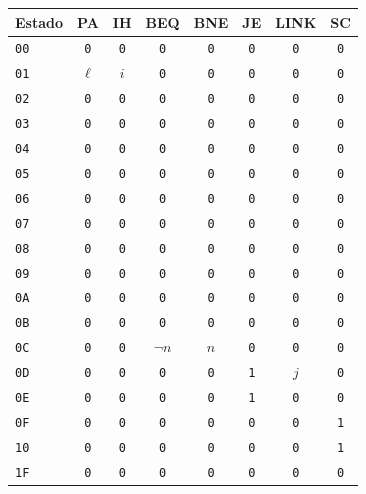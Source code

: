 \documentclass[11pt,a4paper]{article}
\begin{document}
\begin{center}
\footnotesize
\setlength{\tabcolsep}{5.4pt}
\begin{tabular}{@{}lccccccc@{}}
\toprule
Estado & PA & IH & BEQ & BNE & JE & LINK & SC \\
\midrule
\texttt{00} & \texttt{0} & \texttt{0} & \texttt{0} & \texttt{0} & \texttt{0} & \texttt{0} & \texttt{0} \\
\texttt{01} & $\ell$ & $i$ & \texttt{0} & \texttt{0} & \texttt{0} & \texttt{0} & \texttt{0} \\
\texttt{02} & \texttt{0} & \texttt{0} & \texttt{0} & \texttt{0} & \texttt{0} & \texttt{0} & \texttt{0} \\
\texttt{03} & \texttt{0} & \texttt{0} & \texttt{0} & \texttt{0} & \texttt{0} & \texttt{0} & \texttt{0} \\
\texttt{04} & \texttt{0} & \texttt{0} & \texttt{0} & \texttt{0} & \texttt{0} & \texttt{0} & \texttt{0} \\
\texttt{05} & \texttt{0} & \texttt{0} & \texttt{0} & \texttt{0} & \texttt{0} & \texttt{0} & \texttt{0} \\
\texttt{06} & \texttt{0} & \texttt{0} & \texttt{0} & \texttt{0} & \texttt{0} & \texttt{0} & \texttt{0} \\
\texttt{07} & \texttt{0} & \texttt{0} & \texttt{0} & \texttt{0} & \texttt{0} & \texttt{0} & \texttt{0} \\
\texttt{08} & \texttt{0} & \texttt{0} & \texttt{0} & \texttt{0} & \texttt{0} & \texttt{0} & \texttt{0} \\
\texttt{09} & \texttt{0} & \texttt{0} & \texttt{0} & \texttt{0} & \texttt{0} & \texttt{0} & \texttt{0} \\
\texttt{0A} & \texttt{0} & \texttt{0} & \texttt{0} & \texttt{0} & \texttt{0} & \texttt{0} & \texttt{0} \\
\texttt{0B} & \texttt{0} & \texttt{0} & \texttt{0} & \texttt{0} & \texttt{0} & \texttt{0} & \texttt{0} \\
\texttt{0C} & \texttt{0} & \texttt{0} & $\neg n$ & $n$ & \texttt{0} & \texttt{0} & \texttt{0} \\
\texttt{0D} & \texttt{0} & \texttt{0} & \texttt{0} & \texttt{0} & \texttt{1} & $j$ & \texttt{0} \\
\texttt{0E} & \texttt{0} & \texttt{0} & \texttt{0} & \texttt{0} & \texttt{1} & \texttt{0} & \texttt{0} \\
\texttt{0F} & \texttt{0} & \texttt{0} & \texttt{0} & \texttt{0} & \texttt{0} & \texttt{0} & \texttt{1} \\
\texttt{10} & \texttt{0} & \texttt{0} & \texttt{0} & \texttt{0} & \texttt{0} & \texttt{0} & \texttt{1} \\
\texttt{1F} & \texttt{0} & \texttt{0} & \texttt{0} & \texttt{0} & \texttt{0} & \texttt{0} & \texttt{0} \\
\bottomrule
\end{tabular}
\label{tab:pc}
\end{center}
\end{document}
